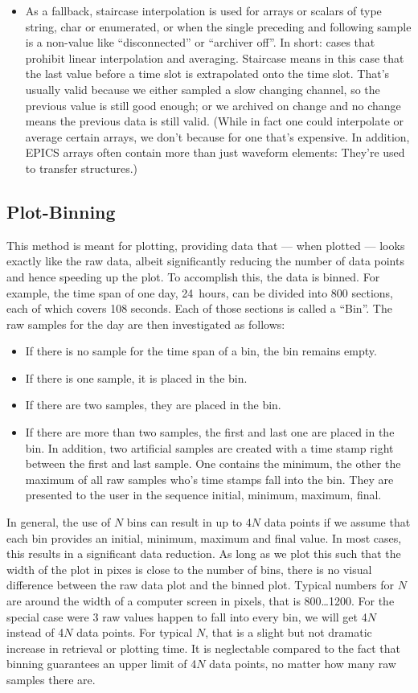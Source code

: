 \begin{itemize}
\item As a fallback, staircase interpolation is used for arrays or
  scalars of type string, char or enumerated, or when the single
  preceding and following sample is a non-value like ``disconnected''
  or ``archiver off''. In short: cases that prohibit linear
  interpolation and averaging.  Staircase means in this case that the
  last value before a time slot is extrapolated onto the time slot.
  That's usually valid because we either sampled a slow changing
  channel, so the previous value is still good enough; or we archived
  on change and no change means the previous data is still valid.
  (While in fact one could interpolate or average certain arrays, we
  don't because for one that's expensive. In addition, EPICS arrays
  often contain more than just waveform elements: They're
  used to transfer structures.)
\end{itemize}

\subsection{Plot-Binning} \label{sec:plotbinning}
This method is meant for plotting, providing data that --- when
plotted --- looks exactly like the raw data, albeit significantly
reducing the number of data points and hence speeding up the plot.  To
accomplish this, the data is binned. For example, the time span of one
day, 24~hours, can be divided into 800 sections, each of which covers 108
seconds. Each of those sections is called a ``Bin''. The raw samples
for the day are then investigated as follows:
\begin{itemize}
\item If there is no sample for the time span of a bin, the bin
  remains empty.
\item If there is one sample, it is placed in the bin.
\item If there are two samples, they are placed in the bin.
\item If there are more than two samples, the first and last one
  are placed in the bin. In addition, two artificial samples are
  created with a time stamp right between the first and last sample.
  One contains the minimum, the other the maximum of all raw samples
  who's time stamps fall into the bin. They are presented to the user
  in the sequence initial, minimum, maximum, final.
\end{itemize}

In general, the use of $N$ bins can result in up to 4$N$ data points
if we assume that each bin provides an initial, minimum, maximum and
final value. In most cases, this results in a significant data
reduction. As long as we plot this such that the width of the plot in
pixes is close to the number of bins, there is no visual difference
between the raw data plot and the binned plot.  Typical numbers for
$N$ are around the width of a computer screen in pixels, that is
800\ldots 1200.  For the special case were 3 raw values happen to fall
into every bin, we will get 4$N$ instead of 4$N$ data points. For
typical $N$, that is a slight but not dramatic increase in retrieval
or plotting time. It is neglectable compared to the fact that binning
guarantees an upper limit of 4$N$ data points, no matter how many raw
samples there are.

